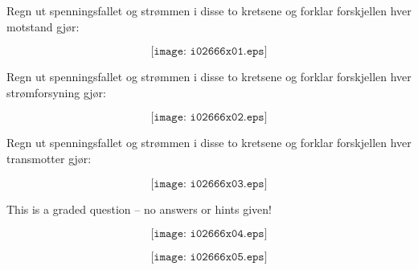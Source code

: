 

Regn ut spenningsfallet og strømmen i disse to kretsene og forklar forskjellen hver motstand gjør:

$$\texttt{[image: i02666x01.eps]}$$

\vskip 60pt

Regn ut spenningsfallet og strømmen i disse to kretsene og forklar forskjellen hver strømforsyning gjør:

$$\texttt{[image: i02666x02.eps]}$$

\vskip 60pt

Regn ut spenningsfallet og strømmen i disse to kretsene og forklar forskjellen hver transmotter gjør:

$$\texttt{[image: i02666x03.eps]}$$

\vfil 

\eject






This is a graded question -- no answers or hints given!







$$\texttt{[image: i02666x04.eps]}$$

$$\texttt{[image: i02666x05.eps]}$$




